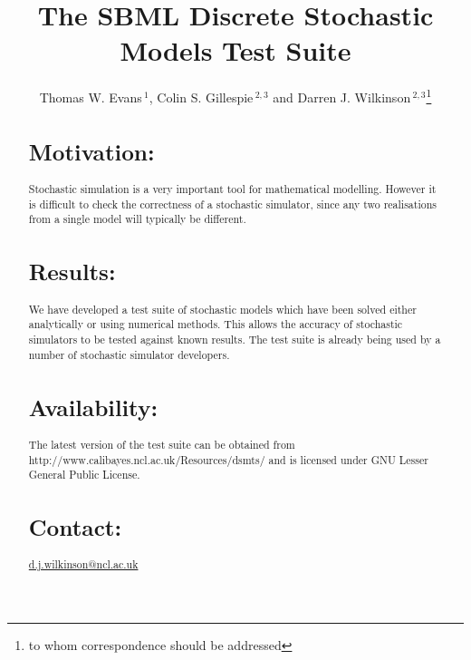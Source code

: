 \documentclass{bioinfo}
\begin{document}

\title[Discrete Stochastic Models Test Suite]{The SBML Discrete Stochastic Models Test Suite}
\author[Evans, T. W. \textit{et~al}]{Thomas W. Evans\,$^{1}$, Colin S. Gillespie\,$^{2,3}$ and Darren J. Wilkinson\,$^{2,3}$\footnote{to whom correspondence should be addressed}}
\address{$^{1}$Department of Mathematical Sciences, University of Liverpool, Liverpool, L69 7ZL.\\
$^{2}$School of Mathematics \& Statistics, Newcastle University,
Newcastle upon Tyne, NE1 7RU, UK.\\
$^{3}$Centre for Integrated Systems Biology of Ageing and Nutrition
(CISBAN), Newcastle University.}



\maketitle

\begin{abstract}

\section{Motivation:}
Stochastic simulation is a very important tool for mathematical
modelling. However it is difficult to check the correctness of a
stochastic simulator, since any two realisations from a single model
will typically be different.

\section{Results:}
We have developed a test suite of stochastic models which have been solved either analytically or using numerical methods. This allows the accuracy of stochastic simulators to be tested against known results. The test suite is already being used by a number of stochastic simulator developers.

\section{Availability:}
The latest version of the test suite can be obtained from
http://www.calibayes.ncl.ac.uk/Resources/dsmts/ and is licensed under
GNU Lesser General Public License.

\section{Contact:} \href{d.j.wilkinson@ncl.ac.uk}{d.j.wilkinson@ncl.ac.uk}
\end{abstract}
\end{document}

